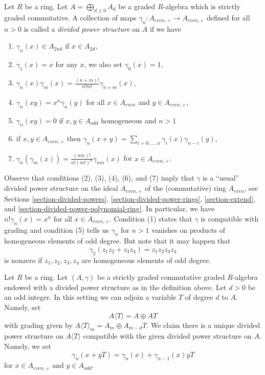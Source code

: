 \begin{definition}
\label{definition-divided-powers-graded}
Let $R$ be a ring. Let $A = \bigoplus_{d \geq 0} A_d$ be a graded
$R$-algebra which is strictly graded commutative. A collection of maps
$\gamma_n : A_{even, +} \to A_{even, +}$ defined for all $n > 0$ is called
a {\it divided power structure} on $A$ if we have
\begin{enumerate}
\item $\gamma_n(x) \in A_{2nd}$ if $x \in A_{2d}$,
\item $\gamma_1(x) = x$ for any $x$, we also set $\gamma_0(x) = 1$,
\item $\gamma_n(x)\gamma_m(x) = \frac{(n + m)!}{n! m!} \gamma_{n + m}(x)$,
\item $\gamma_n(xy) = x^n \gamma_n(y)$ for all $x \in A_{even}$ and
$y \in A_{even, +}$,
\item $\gamma_n(xy) = 0$ if $x, y \in A_{odd}$ homogeneous and $n > 1$
\item if $x, y \in A_{even, +}$ then
$\gamma_n(x + y) = \sum_{i = 0, \ldots, n} \gamma_i(x)\gamma_{n - i}(y)$,
\item $\gamma_n(\gamma_m(x)) =
\frac{(nm)!}{n! (m!)^n} \gamma_{nm}(x)$ for $x \in A_{even, +}$.
\end{enumerate}
\end{definition}

\noindent
Observe that conditions (2), (3), (4), (6), and (7) imply that
$\gamma$ is a ``usual'' divided power structure on the ideal
$A_{even, +}$ of the (commutative) ring $A_{even}$, see
Sections \ref{section-divided-powers},
\ref{section-divided-power-rings},
\ref{section-extend}, and
\ref{section-divided-power-polynomial-ring}.
In particular, we have $n! \gamma_n(x) = x^n$ for all $x \in A_{even, +}$.
Condition (1) states that $\gamma$ is compatible with grading and condition
(5) tells us $\gamma_n$ for $n > 1$ vanishes on products
of homogeneous elements of odd degree. But note that it may happen
that
$$
\gamma_2(z_1 z_2 + z_3 z_4) = z_1z_2z_3z_4
$$
is nonzero if $z_1, z_2, z_3, z_4$ are homogeneous elements of odd degree.

\begin{example}
\label{example-adjoining-odd}
Let $R$ be a ring. Let $(A, \gamma)$ be a strictly graded commutative
graded $R$-algebra endowed with a divided power structure as in the
definition above. Let $d > 0$ be an odd integer.
In this setting we can adjoin a variable $T$ of degree $d$ to $A$.
Namely, set
$$
A\langle T \rangle = A \oplus AT
$$
with grading given by $A\langle T \rangle_m = A_m \oplus A_{m - d}T$.
We claim there is a unique divided power structure on
$A\langle T \rangle$ compatible with the given divided power
structure on $A$. Namely, we set
$$
\gamma_n(x + yT) = \gamma_n(x) + \gamma_{n - 1}(x)yT
$$
for $x \in A_{even, +}$ and $y \in A_{odd}$.
\end{example}

